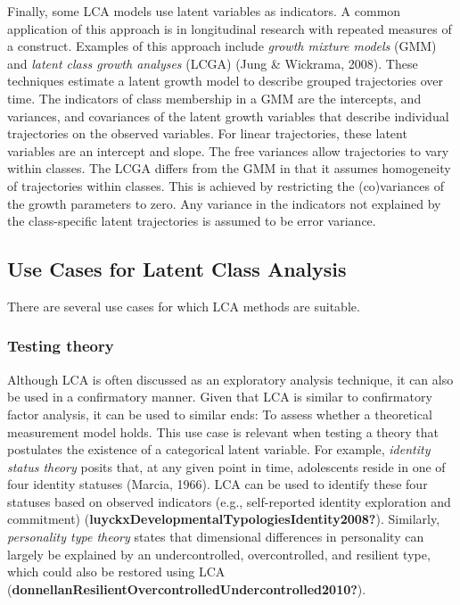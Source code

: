 \documentclass[
  ,man,floatsintext]{apa6}
\begin{document}
Finally, some LCA models use latent variables as indicators. A common
application of this approach is in longitudinal research with repeated
measures of a construct. Examples of this approach include \emph{growth
mixture models} (GMM) and \emph{latent class growth analyses} (LCGA)
(Jung \& Wickrama, 2008). These techniques estimate a latent growth
model to describe grouped trajectories over time. The indicators of
class membership in a GMM are the intercepts, and variances, and
covariances of the latent growth variables that describe individual
trajectories on the observed variables. For linear trajectories, these
latent variables are an intercept and slope. The free variances allow
trajectories to vary within classes. The LCGA differs from the GMM in
that it assumes homogeneity of trajectories within classes. This is
achieved by restricting the (co)variances of the growth parameters to
zero. Any variance in the indicators not explained by the class-specific
latent trajectories is assumed to be error variance.

\hypertarget{use-cases-for-latent-class-analysis}{%
\subsection{Use Cases for Latent Class Analysis}\label{use-cases-for-latent-class-analysis}}

There are several use cases for which LCA methods are suitable.

\hypertarget{testing-theory}{%
\subsubsection{Testing theory}\label{testing-theory}}

Although LCA is often discussed as an exploratory analysis technique, it
can also be used in a confirmatory manner. Given that LCA is similar to
confirmatory factor analysis, it can be used to similar ends: To assess
whether a theoretical measurement model holds. This use case is relevant
when testing a theory that postulates the existence of a categorical
latent variable. For example, \emph{identity status theory} posits that, at
any given point in time, adolescents reside in one of four identity
statuses (Marcia, 1966). LCA can be used to identify these
four statuses based on observed indicators (e.g., self-reported identity
exploration and commitment)
(\textbf{luyckxDevelopmentalTypologiesIdentity2008?}). Similarly, \emph{personality
type theory} states that dimensional differences in personality can
largely be explained by an undercontrolled, overcontrolled, and
resilient type, which could also be restored using LCA
(\textbf{donnellanResilientOvercontrolledUndercontrolled2010?}).
\end{document}
